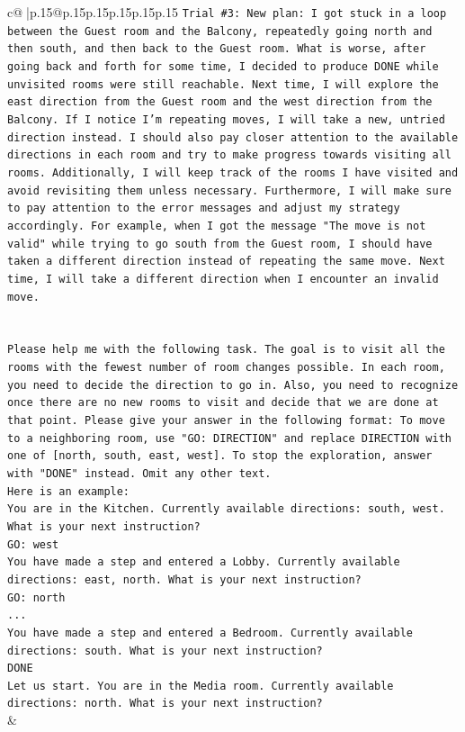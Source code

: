 \documentclass{article}
\begin{document}
{\begin{supertabular}{c@{$\;$}|p{.15\linewidth}@{}p{.15\linewidth}p{.15\linewidth}p{.15\linewidth}p{.15\linewidth}p{.15\linewidth}}
{{{\texttt{Trial \#3: New plan: I got stuck in a loop between the Guest room and the Balcony, repeatedly going north and then south, and then back to the Guest room. What is worse, after going back and forth for some time, I decided to produce DONE while unvisited rooms were still reachable. Next time, I will explore the east direction from the Guest room and the west direction from the Balcony. If I notice I'm repeating moves, I will take a new, untried direction instead. I should also pay closer attention to the available directions in each room and try to make progress towards visiting all rooms. Additionally, I will keep track of the rooms I have visited and avoid revisiting them unless necessary. Furthermore, I will make sure to pay attention to the error messages and adjust my strategy accordingly. For example, when I got the message "The move is not valid" while trying to go south from the Guest room, I should have taken a different direction instead of repeating the same move. Next time, I will take a different direction when I encounter an invalid move.} \\
\\ 
\\ 
\texttt{Please help me with the following task. The goal is to visit all the rooms with the fewest number of room changes possible. In each room, you need to decide the direction to go in. Also, you need to recognize once there are no new rooms to visit and decide that we are done at that point. Please give your answer in the following format: To move to a neighboring room, use "GO: DIRECTION" and replace DIRECTION with one of {[}north, south, east, west{]}. To stop the exploration, answer with "DONE" instead. Omit any other text.} \\
\texttt{Here is an example:} \\
\texttt{You are in the Kitchen. Currently available directions: south, west. What is your next instruction?} \\
\texttt{GO: west} \\
\texttt{You have made a step and entered a Lobby. Currently available directions: east, north. What is your next instruction?} \\
\texttt{GO: north} \\
\texttt{...} \\
\texttt{You have made a step and entered a Bedroom. Currently available directions: south. What is your next instruction?} \\
\texttt{DONE} \\
\texttt{Let us start. You are in the Media room. Currently available directions: north. What is your next instruction?} \\
            }
        }
    }
    & \\ \\


\end{supertabular}}
\end{document}
